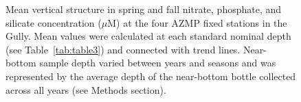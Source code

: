 \documentclass[12pt]{article}\usepackage[]{graphicx}\usepackage[]{color}
\begin{document}
\begin{landscapepage}
\begin{figure}[htb]

{\centering {} 

}

\caption{Mean vertical structure in spring and fall nitrate, phosphate, and silicate concentration (\(\mu\)M) at the four AZMP fixed stations in the Gully. Mean values were calculated at each standard nominal depth (see Table~\ref{tab:table3}) and connected with trend lines. Near-bottom sample depth varied between years and seasons and was represented by the average depth of the near-bottom bottle collected across all years (see Methods section).}\label{fig:figure17}
\end{figure}
\end{landscapepage}
\clearpage
\end{document}
